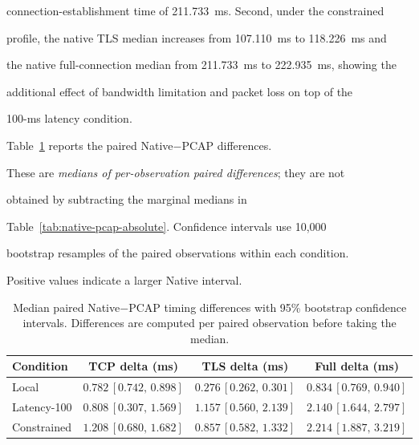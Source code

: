 \documentclass[journal]{IEEEtran}
\begin{document}
connection-establishment time of 211.733~ms. Second, under the constrained

profile, the native TLS median increases from 107.110~ms to 118.226~ms and

the native full-connection median from 211.733~ms to 222.935~ms, showing the

additional effect of bandwidth limitation and packet loss on top of the

100-ms latency condition.



Table~\ref{tab:native-pcap} reports the paired Native$-$PCAP differences.

These are \emph{medians of per-observation paired differences}; they are not

obtained by subtracting the marginal medians in

Table~\ref{tab:native-pcap-absolute}. Confidence intervals use 10,000

bootstrap resamples of the paired observations within each condition.

Positive values indicate a larger Native interval.



\begin{table}[t]

\caption{Median paired Native$-$PCAP timing differences with 95\% bootstrap confidence intervals. Differences are computed per paired observation before taking the median.}

\label{tab:native-pcap}

\centering

\begin{tabular}{lccc}

\toprule

\textbf{Condition} &

\textbf{TCP delta (ms)} &

\textbf{TLS delta (ms)} &

\textbf{Full delta (ms)} \\

\midrule

Local &

$0.782\,[0.742,\,0.898]$ &

$0.276\,[0.262,\,0.301]$ &

$0.834\,[0.769,\,0.940]$ \\

Latency-100 &

$0.808\,[0.307,\,1.569]$ &

$1.157\,[0.560,\,2.139]$ &

$2.140\,[1.644,\,2.797]$ \\

Constrained &

$1.208\,[0.680,\,1.682]$ &

$0.857\,[0.582,\,1.332]$ &

$2.214\,[1.887,\,3.219]$ \\

\bottomrule

\end{tabular}

\end{table}
\end{document}

